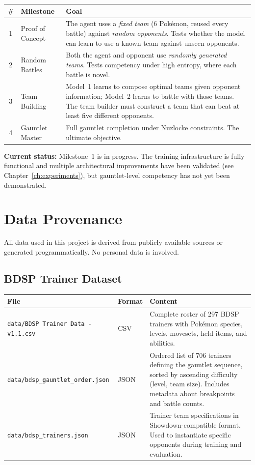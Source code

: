 \begin{center}
\small
\begin{tabularx}{\textwidth}{c l X}
  \toprule
  \textbf{\#} & \textbf{Milestone} & \textbf{Goal} \\
  \midrule
  1 & Proof of Concept &
    The agent uses a \emph{fixed team} (6 Pok\'{e}mon, reused every battle)
    against \emph{random opponents}.  Tests whether the model can learn to
    use a known team against unseen opponents. \\
  2 & Random Battles &
    Both the agent and opponent use \emph{randomly generated teams}.  Tests
    competency under high entropy, where each battle is novel. \\
  3 & Team Building &
    Model~1 learns to compose optimal teams given opponent information;
    Model~2 learns to battle with those teams.  The team builder must
    construct a team that can beat at least five different opponents. \\
  4 & Gauntlet Master &
    Full gauntlet completion under Nuzlocke constraints.  The ultimate
    objective. \\
  \bottomrule
\end{tabularx}
\end{center}

\textbf{Current status:} Milestone~1 is in progress.  The training
infrastructure is fully functional and multiple architectural improvements have
been validated (see Chapter~\ref{ch:experiments}), but gauntlet-level
competency has not yet been demonstrated.

\section{Data Provenance}

All data used in this project is derived from publicly available sources or
generated programmatically.  No personal data is involved.

\subsection{BDSP Trainer Dataset}

\begin{center}
\small
\begin{tabularx}{\textwidth}{l l X}
  \toprule
  \textbf{File} & \textbf{Format} & \textbf{Content} \\
  \midrule
  \texttt{data/BDSP Trainer Data - v1.1.csv} & CSV &
    Complete roster of 297 BDSP trainers with Pok\'{e}mon species, levels,
    movesets, held items, and abilities. \\
  \texttt{data/bdsp\_gauntlet\_order.json} & JSON &
    Ordered list of 706 trainers defining the gauntlet sequence, sorted by
    ascending difficulty (level, team size).  Includes metadata about
    breakpoints and battle counts. \\
  \texttt{data/bdsp\_trainers.json} & JSON &
    Trainer team specifications in Showdown-compatible format.  Used to
    instantiate specific opponents during training and evaluation. \\
  \bottomrule
\end{tabularx}
\end{center}

